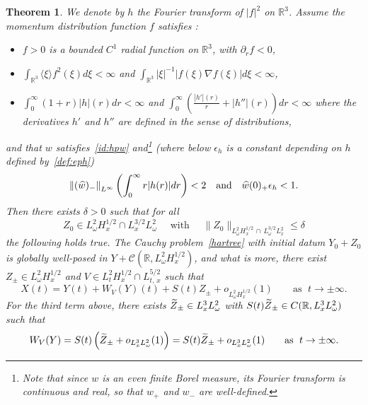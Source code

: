 \documentclass[10pt]{amsart}
\newtheorem{theo}{Theorem}[section]
\theoremstyle{definition}\newtheorem{defi}[theo]{Definition}\newtheorem{rema}[theo]{Remark}\newtheorem{exam}[theo]{Example}\newtheorem{exem}[theo]{Example}\newtheorem{nota}[theo]{Notation}
\newcommand{\R}{\mathbb{R}}
\newcommand{\mclC}{\mathcal{C}}
\let\oldtilde\tilde
\renewcommand*{\tilde}[1]{\mathchoice{\widetilde{#1}}{\widetilde{#1}}{\oldtilde{#1}}{\oldtilde{#1}}}
\let\oldhat\hat
\renewcommand*{\hat}[1]{\mathchoice{\widehat{#1}}{\widehat{#1}}{\oldhat{#1}}{\oldhat{#1}}}
\begin{document}
\begin{theo}\label{th:main}
We denote by $h$ the Fourier transform of $|f|^2$ on $\R^3$.
Assume the momentum distribution function $f$ satisfies :
\begin{itemize}
\item $f>0$ is a bounded $C^1$ radial function on $\R^3$, with $\partial_r f<0$,
\item $\int_{\R^3} \langle \xi \rangle f^2(\xi)d\xi<\infty$ and $\int_{\R^3}|\xi|^{-1} |f(\xi)\nabla f(\xi)|d\xi < \infty$,
\item $\int_0^\infty (1+r)|h|(r)dr<\infty$ and $\int_0^\infty (\tfrac{|h'|(r)}{r}+|h''|(r))dr<\infty$ where the derivatives $h'$ and $h''$ are defined in the sense of distributions,
\end{itemize}
and that $w$ satisfies~\eqref{id:hpw} and\footnote{Note that since $w$ is an even finite Borel measure, its Fourier transform is continuous and real, so that $w_+$ and $w_-$ are well-defined.} (where below $\epsilon_h$ is a constant depending on $h$ defined by~\eqref{def:eph})
\[
\left\| (\hat w)_-\right\|_{L^{\infty}}\left(\int_{0}^{\infty} r|h(r)|dr\right)<2 \quad \text{and} \quad \hat w (0)_+ \epsilon_h <1.
\]
Then there exists $\delta>0$ such that for all
\[
Z_0\in L^2_\omega H^{1/2}_x \cap L^{3/2}_{x}L^2_\omega\quad\text{ with }\quad\| Z_0\|_{L^2_\omega H^{1/2}_x\,\cap\,L^{3/2}_{\omega}L^2_x}\leq \delta
\]
the following holds true. The Cauchy problem~\eqref{hartree} with initial datum $Y_0+Z_0$ is globally well-posed in $Y + \mclC (\R, L^2_\omega H^{1/2}_x)$, and what is more, there exist $Z_\pm \in L^2_\omega H^{1/2}_x$ and $V\in L^{2}_{t}H^{1/2}_x\cap L^{5/2}_{t,\,x}$ such that
\begin{equation} \label{id:mainresult}
X(t) = Y(t) + W_V(Y)(t) +S(t) Z_\pm +o_{L^2_\omega H^{1/2}_x}(1) \qquad \text{as }\; t\rightarrow \pm \infty.
\end{equation} For the third term above, there exists $\tilde Z_\pm \in L^3_x L^2_\omega$ with $S(t) \tilde Z_\pm \in C(\R,L^3_x L^2_\omega)$ such that
\begin{equation} \label{id:mainresult2}
W_V(Y) = S(t) \left(\tilde Z_\pm + o_{L^3_x L^2_\omega}(1) \right)= S(t) \tilde Z_\pm + o_{L^3_xL^2_\omega} (1) \qquad\text{as }\; t\rightarrow \pm \infty.
\end{equation}
\end{theo}
\end{document}
